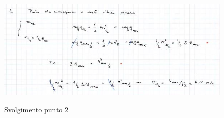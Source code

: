 \begin{esempio}
	\begin{figure}[h]
	\begin{center}
		\includegraphics[width=12cm]{lezione7/images/11Precorsolavoroedenergia.jpg}\\
		\caption{Svolgimento punto 2}
	\end{center}
\end{figure}

\end{esempio}
